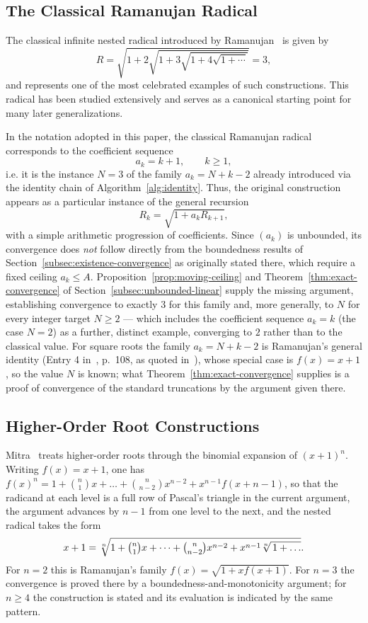 \documentclass[11pt,a4paper]{amsart}
\theoremstyle{plain}
\theoremstyle{definition}
\theoremstyle{remark}
\begin{document}
\subsection{The Classical Ramanujan Radical}
\label{subsec:classical-ramanujan}

The classical infinite nested radical introduced by Ramanujan~\cite{RamanujanNotebooks} is given by
\[
R = \sqrt{1 + 2\sqrt{1 + 3\sqrt{1 + 4\sqrt{1 + \cdots}}}} = 3,
\]
and represents one of the most celebrated examples of such constructions. This radical has been studied extensively and serves as a canonical starting point for many later generalizations.

In the notation adopted in this paper, the classical Ramanujan radical corresponds to the coefficient sequence
\[
a_k = k+1, \qquad k \geq 1,
\]
i.e. it is the instance $N=3$ of the family $a_k = N+k-2$ already introduced via the identity chain of Algorithm~\ref{alg:identity}. Thus, the original construction appears as a particular instance of the general recursion
\[
R_k = \sqrt{1 + a_k R_{k+1}},
\]
with a simple arithmetic progression of coefficients. Since $(a_k)$ is unbounded, its convergence does \emph{not} follow directly from the boundedness results of Section~\ref{subsec:existence-convergence} as originally stated there, which require a fixed ceiling $a_k \le A$. Proposition~\ref{prop:moving-ceiling} and Theorem~\ref{thm:exact-convergence} of Section~\ref{subsec:unbounded-linear} supply the missing argument, establishing convergence to exactly $3$ for this family and, more generally, to $N$ for every integer target $N \ge 2$ — which includes the coefficient sequence $a_k = k$ (the case $N=2$) as a further, distinct example, converging to $2$ rather than to the classical value. For square roots the family $a_k=N+k-2$ is Ramanujan's general identity (Entry 4 in~\cite{BerndtNotebooksII}, p.~108, as quoted in~\cite{MitraNestedRadicals}), whose special case is $f(x)=x+1$, so the value $N$ is known; what Theorem~\ref{thm:exact-convergence} supplies is a proof of convergence of the standard truncations by the argument given there.

\subsection{Higher-Order Root Constructions}
\label{subsec:higher-order-roots}

Mitra~\cite{MitraNestedRadicals} treats higher-order roots through the binomial expansion of $(x+1)^n$. Writing $f(x)=x+1$, one has $f(x)^n = 1+\binom n1 x+\dots+\binom n{n-2}x^{n-2} + x^{n-1}f(x+n-1)$, so that the radicand at each level is a full row of Pascal's triangle in the current argument, the argument advances by $n-1$ from one level to the next, and the nested radical takes the form
\[
x+1=\sqrt[n]{1+\tbinom n1 x+\dots+\tbinom n{n-2}x^{n-2}+x^{n-1}\sqrt[n]{\,1+\dots}}.
\]
For $n=2$ this is Ramanujan's family $f(x)=\sqrt{1+x f(x+1)}$. For $n=3$ the convergence is proved there by a boundedness-and-monotonicity argument; for $n\ge 4$ the construction is stated and its evaluation is indicated by the same pattern.
\end{document}
